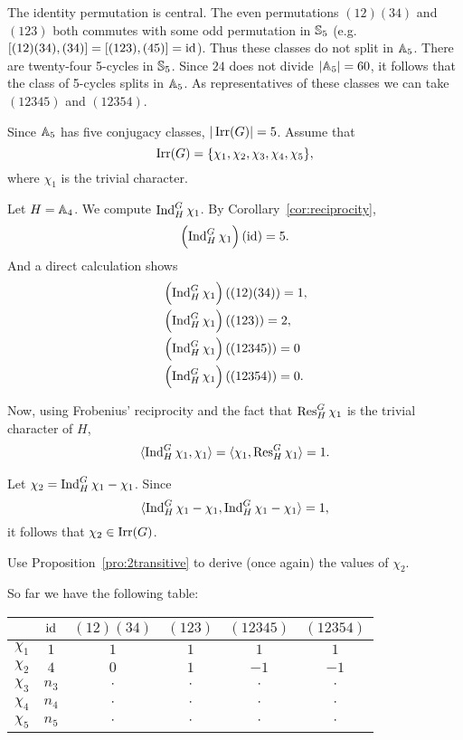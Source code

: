 The identity permutation is central. The even permutations 
$(12)(34)$ and $(123)$ both commutes with some odd permutation in $\mathbb{S}_5$ (e.g. 
$[(12)(34),(34)]=[(123),(45)]=\operatorname{id}$). Thus these classes do not split
in $\mathbb{A}_5$. There are twenty-four 5-cycles in $\mathbb{S}_5$. Since $24$ does not
divide $|\mathbb{A}_5|=60$, it follows that the class of 5-cycles
splits in $\mathbb{A}_5$. As representatives of these classes
we can take $(12345)$ and $(12354)$. 

Since $\mathbb{A}_5$ has five conjugacy classes, $|\operatorname{Irr}(G)|=5$. Assume that 
\[
\operatorname{Irr}(G)=\{\chi_1,\chi_2,\chi_3,\chi_4,\chi_5\}, 
\]
where $\chi_1$ is the trivial character. 

Let $H=\mathbb{A}_4$. We compute $\operatorname{Ind}_H^G\chi_1$. By Corollary~\ref{cor:reciprocity}, 
\[
\left(\operatorname{Ind}_H^G\chi_1\right)(\operatorname{id}) = 5.
\]
And a direct calculation shows
\begin{align*}
    &\left(\operatorname{Ind}_H^G\chi_1\right)((12)(34)) = 1,\\
    &\left(\operatorname{Ind}_H^G\chi_1\right)((123)) = 2,\\
    &\left(\operatorname{Ind}_H^G\chi_1\right)((12345)) = 0\\ 
    &\left(\operatorname{Ind}_H^G\chi_1\right)((12354)) = 0.
\end{align*}

Now, using Frobenius' reciprocity and the fact that 
$\operatorname{Res}_H^G\chi_1$ is the trivial character of $H$, 
\begin{align*}
    \langle\operatorname{Ind}_H^G\chi_1,\chi_1\rangle = \langle\chi_1,\operatorname{Res}_H^G\chi_1\rangle=1.
\end{align*}

Let $\chi_2=\operatorname{Ind}_H^G\chi_1-\chi_1$. Since 
\[
\langle\operatorname{Ind}_H^G\chi_1-\chi_1,\operatorname{Ind}_H^G\chi_1-\chi_1\rangle=1, 
\]
it follows that $\chi_2\in\operatorname{Irr}(G)$. 

\begin{exercise}
\label{xca:A5_chi2}
    Use Proposition~\ref{pro:2transitive} to derive (once again) the values of $\chi_2$.
\end{exercise}

So far we have the 
following table: 

\bigskip 
\begin{center}
        \begin{tabular}{|c|ccccc|}
        \hline  
         & $\operatorname{id}$ & $(12)(34)$ & $(123)$ & $(12345)$ & $(12354)$\\
        \hline 
        $\chi_1$ & $1$ & $1$ & $1$ & $1$ & $1$\\
        $\chi_2$ & $4$ & $0$ & $1$ & $-1$ & $-1$\\
        $\chi_3$ & $n_3$ & $\cdot$ & $\cdot$ & $\cdot$& $\cdot$\\
        $\chi_4$ & $n_4$ & $\cdot$ & $\cdot$ & $\cdot$& $\cdot$\\
        $\chi_5$ & $n_5$ & $\cdot$ & $\cdot$ & $\cdot$& $\cdot$\\
        \hline 
    \end{tabular}
\end{center}
\bigskip 

